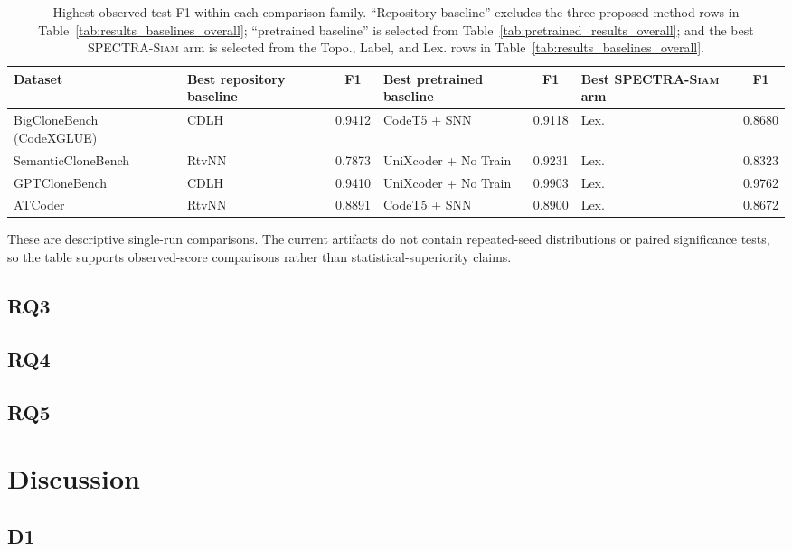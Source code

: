 \documentclass[authoryear,final,5p,times,twocolumn]{elsarticle}
\newcommand{\method}{\textsc{SPECTRA-Siam}}
\theoremstyle{plain}
\begin{document}
\begin{table}[t]
\centering
\caption{Highest observed test F1 within each comparison family. ``Repository
baseline'' excludes the three proposed-method rows in
Table~\ref{tab:results_baselines_overall}; ``pretrained baseline'' is selected
from Table~\ref{tab:pretrained_results_overall}; and the best \method{} arm is
selected from the Topo., Label, and Lex. rows in
Table~\ref{tab:results_baselines_overall}.}
\label{tab:best_results_by_source}
\small
\begin{tabularx}{\textwidth}{lXcXcXc}
\toprule
Dataset & Best repository baseline & F1 & Best pretrained baseline & F1 &
Best \method{} arm & F1 \\
\midrule
BigCloneBench (CodeXGLUE) & CDLH & 0.9412 & CodeT5 + SNN & 0.9118 & Lex. & 0.8680 \\
SemanticCloneBench & RtvNN & 0.7873 & UniXcoder + No Train & 0.9231 & Lex. & 0.8323 \\
GPTCloneBench & CDLH & 0.9410 & UniXcoder + No Train & 0.9903 & Lex. & 0.9762 \\
ATCoder & RtvNN & 0.8891 & CodeT5 + SNN & 0.8900 & Lex. & 0.8672 \\
\bottomrule
\end{tabularx}
\end{table}

These are descriptive single-run comparisons. The current artifacts do not
contain repeated-seed distributions or paired significance tests, so the table
supports observed-score comparisons rather than statistical-superiority claims.


\subsection{RQ3}
\label{sec:rq3}
\subsection{RQ4}
\label{sec:r4}
\subsection{RQ5}
\label{sec:rq5}

\section{Discussion}
\label{sec:discussion}

\subsection{D1}
\label{sec:sim_measures_baselines}
\end{document}
